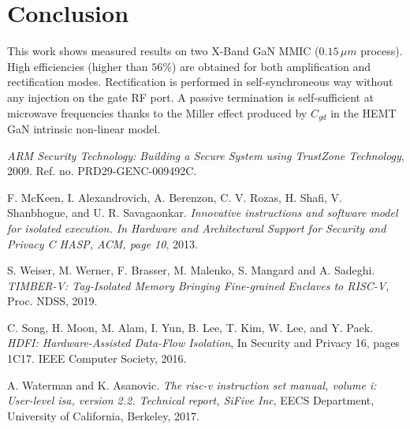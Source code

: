 \documentclass[conference]{IEEEtran}
\begin{document}
\section{Conclusion}
This work shows measured results on two X-Band GaN MMIC ($0.15\,\mu m$ process). High efficiencies (higher than $56\%$) are obtained for both amplification and rectification modes. Rectification is performed in self-synchroneous way without any injection on the gate RF port. A passive termination is self-sufficient at microwave frequencies thanks to the Miller effect produced by $C_{gd}$ in the HEMT GaN intrinsic non-linear model.




\begin{thebibliography}{1}

\emph{ARM Security Technology: Building a Secure System using TrustZone Technology}, 2009. Ref. no. PRD29-GENC-009492C.

F. McKeen, I. Alexandrovich, A. Berenzon, C. V. Rozas, H. Shafi, V. Shanbhogue, and U. R. Savagaonkar.
\emph{Innovative instructions and software model for isolated execution. In Hardware and Architectural
Support for Security and Privacy C HASP, ACM, page 10}, 2013. 

S. Weiser, M. Werner, F. Brasser, M. Malenko, S. Mangard and A. Sadeghi.
\emph{TIMBER-V: Tag-Isolated Memory Bringing Fine-grained Enclaves to RISC-V},
Proc. NDSS, 2019.

C. Song, H. Moon, M. Alam, I. Yun, B. Lee, T. Kim, W. Lee, and Y. Paek. 
\emph{HDFI: Hardware-Assisted Data-Flow Isolation},
In Security and Privacy 16, pages 1C17. IEEE Computer Society, 2016.

A. Waterman and K. Asanovic. 
\emph{The risc-v instruction set manual,
volume i: User-level isa, version 2.2. Technical report, SiFive Inc},
EECS Department, University of California, Berkeley, 2017.

\end{thebibliography}
\end{document}
